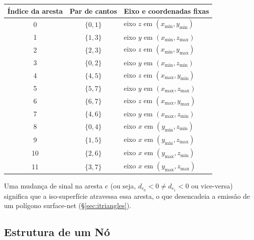 \documentclass[10pt,a4paper]{article}
\begin{document}
\begin{center}
\small
\begin{tabular}{c|c|l}
  \toprule
  Índice da aresta & Par de cantos & Eixo e coordenadas fixas\\
  \midrule
  0  & $\{0,1\}$ & eixo $z$ em $(x_{\min}, y_{\min})$\\
  1  & $\{1,3\}$ & eixo $y$ em $(x_{\min}, z_{\max})$\\
  2  & $\{2,3\}$ & eixo $z$ em $(x_{\min}, y_{\max})$\\
  3  & $\{0,2\}$ & eixo $y$ em $(x_{\min}, z_{\min})$\\
  4  & $\{4,5\}$ & eixo $z$ em $(x_{\max}, y_{\min})$\\
  5  & $\{5,7\}$ & eixo $y$ em $(x_{\max}, z_{\max})$\\
  6  & $\{6,7\}$ & eixo $z$ em $(x_{\max}, y_{\max})$\\
  7  & $\{4,6\}$ & eixo $y$ em $(x_{\max}, z_{\min})$\\
  8  & $\{0,4\}$ & eixo $x$ em $(y_{\min}, z_{\min})$\\
  9  & $\{1,5\}$ & eixo $x$ em $(y_{\min}, z_{\max})$\\
  10 & $\{2,6\}$ & eixo $x$ em $(y_{\max}, z_{\min})$\\
  11 & $\{3,7\}$ & eixo $x$ em $(y_{\max}, z_{\max})$\\
  \bottomrule
\end{tabular}
\end{center}

\noindent
Uma mudança de sinal na aresta $e$ (ou seja, $d_{e_0} < 0 \neq
d_{e_1} < 0$ ou vice-versa) significa que a iso-superfície atravessa
essa aresta, o que desencadeia a emissão de um polígono surface-net
(\S\ref{sec:itriangles}).

\subsection{Estrutura de um Nó}
\end{document}
